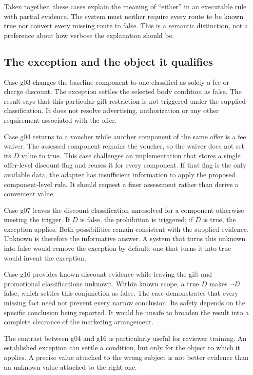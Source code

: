 \documentclass[12pt,a4paper,oneside,openany]{book}
\begin{document}
Taken together, these cases explain the meaning of ``either'' in an executable
rule with partial evidence. The system must neither require every route to be
known true nor convert every missing route to false. This is a semantic
distinction, not a preference about how verbose the explanation should be.

\subsection{The exception and the object it qualifies}
Case g03 changes the baseline component to one classified as solely a fee or
charge discount. The exception settles the selected body condition as false.
The result says that this particular gift restriction is not triggered under
the supplied classification. It does not resolve advertising, authorization or
any other requirement associated with the offer.

Case g04 returns to a voucher while another component of the same offer is a
fee waiver. The assessed component remains the voucher, so the waiver does not
set its $D$ value to true. This case challenges an implementation that stores a
single offer-level discount flag and reuses it for every component. If that flag
is the only available data, the adapter has insufficient information to apply
the proposed component-level rule. It should request a finer assessment rather
than derive a convenient value.

Case g07 leaves the discount classification unresolved for a component otherwise
meeting the trigger. If $D$ is false, the prohibition is triggered; if $D$ is
true, the exception applies. Both possibilities remain consistent with the
supplied evidence. Unknown is therefore the informative answer. A system that
turns this unknown into false would remove the exception by default; one that
turns it into true would invent the exception.

Case g16 provides known discount evidence while leaving the gift and promotional
classifications unknown. Within known scope, a true $D$ makes $\neg D$ false,
which settles this conjunction as false. The case demonstrates that every
missing fact need not prevent every narrow conclusion. Its safety depends on
the specific conclusion being reported. It would be unsafe to broaden the
result into a complete clearance of the marketing arrangement.

The contrast between g04 and g16 is particularly useful for reviewer training.
An established exception can settle a condition, but only for the object to
which it applies. A precise value attached to the wrong subject is not better
evidence than an unknown value attached to the right one.
\end{document}
